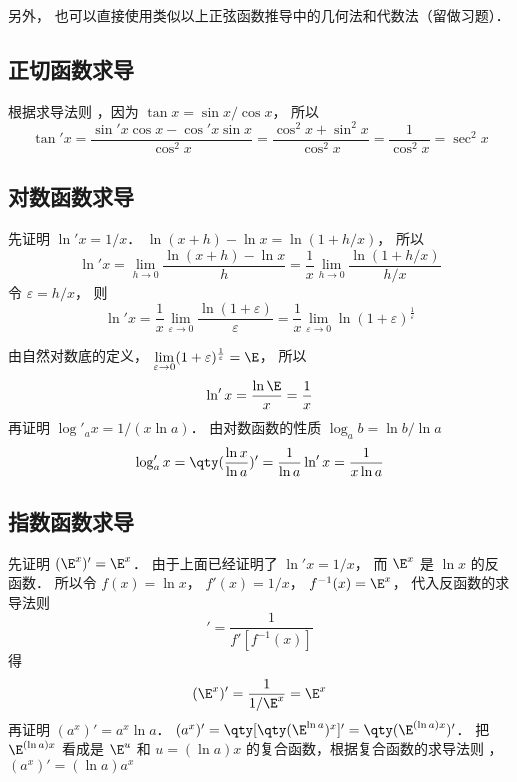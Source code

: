 另外， 也可以直接使用类似以上正弦函数推导中的几何法和代数法（留做习题）．

\subsection{正切函数求导}
根据求导法则%
，因为 $\tan x = \sin x/\cos x$， 所以
\begin{equation}
\tan' x = \frac{\sin' x \cos x - \cos' x\sin x}{\cos^2 x} = \frac{\cos^2x + \sin^2 x}{\cos^2 x} = \frac{1}{\cos ^2 x} = \sec ^2 x
\end{equation}

\subsection{对数函数求导}
先证明 $\ln' x = {1}/{x}$．  $\ln(x + h) - \ln x = \ln(1 + h/x)$， 所以
 \begin{equation}
\ln 'x = \lim_{h \to 0} \frac{\ln(x + h) - \ln x}{h} = \frac{1}{x} \lim_{h \to 0} \frac{\ln(1 + h/x)}{h/x}
\end{equation}
令 $\varepsilon  = h/x$， 则
\begin{equation}
\ln' x = \frac{1}{x} \lim_{\varepsilon  \to 0} \frac{\ln(1 + \varepsilon)}{\varepsilon } = \frac{1}{x} \lim_{\varepsilon  \to 0} \ln(1 + \varepsilon)^{\frac{1}{\varepsilon }} 
\end{equation}
 
由自然对数底的定义， $\lim\limits_{\varepsilon  \to 0} (1 + \varepsilon)^{\frac{1}{\varepsilon }} = \E$， 所以
 \begin{equation}
\ln 'x = \frac{\ln \E}{x} = \frac{1}{x}
\end{equation}
再证明 $\log'_a x = {1}/(x\ln a)$． 
由对数函数的性质 $\log_a b = \ln b/\ln a$
\begin{equation}
\log'_a x = \qty(\frac{\ln x}{\ln a})' = \frac{1}{\ln a}\ln' x = \frac{1}{x\ln a}
\end{equation}

\subsection{指数函数求导}
先证明 $(\E^x)' = \E^x$． 
由于上面已经证明了 $ \ln'x = 1/x$， 而 $\E^x$ 是 $\ln x$ 的反函数． 所以令 $f(x) = \ln x$， $f'(x) = 1/x$，  $f^{ - 1} (x) = \E^x$， 代入反函数的求导法则%
\begin{equation}
[f^{-1} (x)]' = \frac{1}{f'[f^{ - 1}(x)]}
\end{equation} 
得
\begin{equation}
(\E^x)' = \frac{1}{1/\E^x} = \E^x
\end{equation}
再证明 $(a^x)' = a^x \ln a$．  $(a^x)' = \qty[ \qty( \E^{\ln a} )^x ]' = \qty( \E^{(\ln a) x} )'$． 把 $\E^{(\ln a) x}$ 看成是 $\E^u$ 和 $u = (\ln a) x$ 的复合函数，根据复合函数的求导法则 ，$(a^x)' = (\ln a) a^x$ 

